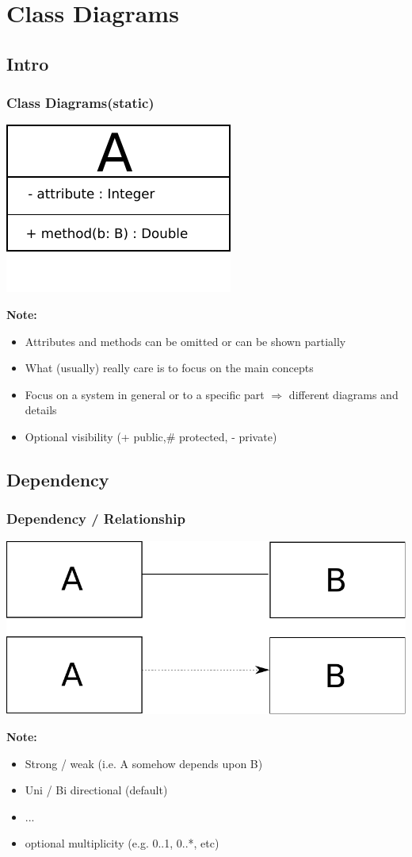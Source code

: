 \documentclass{beamer}
\begin{document}
\section{Class Diagrams}
\subsection{Intro}
\begin{frame}
	\frametitle{Class Diagrams(static)}
	\begin{center}
		\includegraphics[scale=0.6]{class}
	\end{center}
	\textbf{Note:}
	\begin{itemize}
	\item Attributes and methods can be omitted or can be shown partially
	\item What (usually) really care is to focus on the main concepts
  	\item Focus on a system in general or to a specific part $\Rightarrow$ different diagrams and details
	\item Optional visibility (+ public,\# protected, - private)
	\end{itemize}
\end{frame}

\subsection{Dependency}
\begin{frame}
	\frametitle{Dependency / Relationship}
	\begin{center}
		\includegraphics[scale=0.4]{association}
	\end{center}
	\textbf{Note:}
	\begin{itemize}
  			\item Strong / weak (i.e. A somehow depends upon B)
  			\item Uni / Bi directional (default)
  			\item ...
  			\item optional multiplicity (e.g. 0..1, 0..*, etc)
	\end{itemize}
\end{frame}
\end{document}
